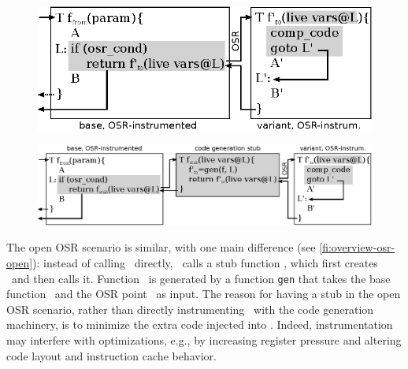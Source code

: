 

\ifdefined\noauthorea
\begin{figure}[t]
\begin{center}
\includegraphics[width=0.7\columnwidth]{figures/overview-osr-final/overview-osr-final.eps}
\caption{\protect}
\end{center}
\end{figure}
\fi

\ifdefined\noauthorea
\begin{figure}[h!]
\begin{center}
\includegraphics[width=1.0\columnwidth]{figures/overview-osr-open/overview-osr-open.eps}
\caption{\protect}
\end{center}
\end{figure}
\fi

\noindent The open OSR scenario is similar, with one main difference (see \myfigure\ref{fi:overview-osr-open}): instead of calling \fosrto\ directly, \fosrfrom\ calls a stub function \fstub, which first creates \fosrto\ and then calls it. Function \fosrto\ is generated by a function {\tt gen} that takes the base function \fbase\ and the OSR point \osrpoint\ as input. The reason for having a stub in the open OSR scenario, rather than directly instrumenting \fbase\ with the code generation machinery, is to minimize the extra code injected into \fbase. Indeed, instrumentation may interfere with optimizations, e.g., by increasing register pressure and altering code layout and instruction cache behavior.


